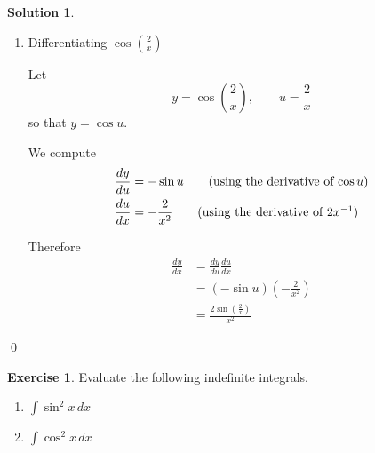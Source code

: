 \documentclass[a4paper]{article}
\theoremstyle{plain} %
\theoremstyle{definition} %
\newtheorem*{solution}{Solution}
\newtheorem{exercise}{Exercise}
\numberwithin{equation}{subsection}
\begin{document}
\begin{solution}
\begin{enumerate}
    Therefore
    \begin{align*}
        \frac{dy}{dx} &= \frac{dy}{du}\frac{du}{dx}\\
        &= \cos u \cdot 48x^2\\
        &= 48x^2 \cos(16x^3)
    \end{align*}

    \item Differentiating $\cos\!\left(\frac{2}{x}\right)$

    Let
    \[
        y = \cos\!\left(\frac{2}{x}\right), \qquad u = \frac{2}{x}
    \]
    so that $y = \cos u$.

    We compute
    \begin{align*}
        \frac{dy}{du} &= -\sin u \tag{using the derivative of $\cos u$}\\
        \frac{du}{dx} &= -\frac{2}{x^2} \tag{using the derivative of $2x^{-1}$}
    \end{align*}

    Therefore
    \begin{align*}
        \frac{dy}{dx} &= \frac{dy}{du}\frac{du}{dx}\\
        &= (-\sin u)\left(-\frac{2}{x^2}\right)\\
        &= \frac{2\sin\!\left(\frac{2}{x}\right)}{x^2}
    \end{align*}
\end{enumerate}
\qed
\end{solution}


\begin{exercise}
Evaluate the following indefinite integrals.
\begin{enumerate}
    \item $\displaystyle \int \sin^2 x \, dx$
    \item $\displaystyle \int \cos^2 x \, dx$
\end{enumerate}
\end{exercise}
\end{document}
